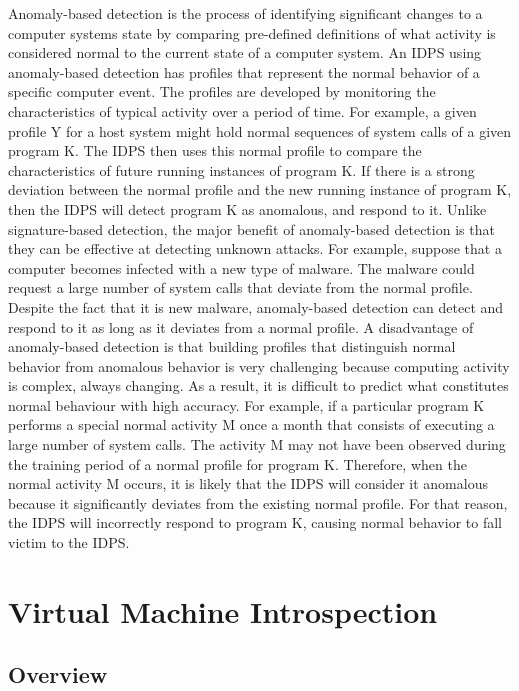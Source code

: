 \documentclass{report}
\begin{document}
\begin{spacing}{1.5}
{\large
Anomaly-based detection is the process of identifying significant changes to a computer systems state by comparing pre-defined definitions of what activity is considered normal to the current state of a computer system. An IDPS using anomaly-based detection has profiles that represent the normal behavior of a specific computer event. The profiles are developed by monitoring the characteristics of typical activity over a period of time. For example, a given profile Y for a host system might hold normal sequences of system calls of a given program K. The IDPS then uses this normal profile to compare the characteristics of future running instances of program K. If there is a strong deviation between the normal profile and the new running instance of program K, then the IDPS will detect program K as anomalous, and respond to it. Unlike signature-based detection, the major benefit of anomaly-based detection is that they can be effective at detecting unknown attacks. For example, suppose that a computer becomes infected with a new type of malware. The malware could request a large number of system calls that deviate from the normal profile. Despite the fact that it is new malware, anomaly-based detection can detect and respond to it as long as it deviates from a normal profile. A disadvantage of anomaly-based detection is that building profiles that distinguish normal behavior from anomalous behavior is very challenging because computing activity is complex, always changing. As a result, it is difficult to predict what constitutes normal behaviour with high accuracy. For example, if a particular program K performs a special normal activity M once a month that consists of executing a large number of system calls. The activity M may not have been observed during the training period of a normal profile for program K. Therefore, when the normal activity M occurs, it is likely that the IDPS will consider it anomalous because it significantly deviates from the existing normal profile. For that reason, the IDPS will incorrectly respond to program K, causing normal behavior to fall victim to the IDPS. 
\newline
}


\section{Virtual Machine Introspection}

\subsection{Overview}


\end{spacing}
\end{document}
